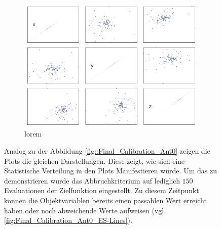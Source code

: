 \begin{figure}[h]
\begin{subfigure}[h]{0.4\textwidth}
                 \label{fig:abortedFinal_Calibration_Ant0_ES-Lines}
         \end{subfigure}
%
\\
%
         \begin{subfigure}[h]{0.4\textwidth}
                 \centering
                 \includegraphics[width=\textwidth]{img/calibration/aborted_calibration_ant0-scatter.png}
                 \caption{lorem}
                 \label{fig:abortedFinal_Calibration_Ant0_ES-Scatter}
         \end{subfigure}
%
         \caption[Statistisch verteilte Ergebnisse der Evolutionären Kalibrierung]{Analog zu der Abbildung \ref{fig::Final_Calibration_Ant0} zeigen die Plots die gleichen Darstellungen. Diese zeigt, wie sich eine Statistische Verteilung in den Plots Manifestieren würde. Um das zu demonstrieren wurde das Abbruchkriterium auf lediglich $150$ Evaluationen der Zielfunktion eingestellt. Zu diesem Zeitpunkt können die Objektvariablen bereits einen passablen Wert erreicht haben oder noch abweichende Werte aufweisen (vgl. \ref{fig:Final_Calibration_Ant0_ES-Lines}).}
         \label{fig::abortedFinal_Calibration_Ant0_ES}
\end{figure}
%
